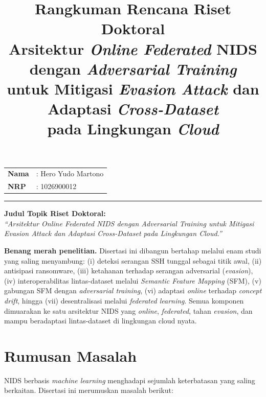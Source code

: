 \documentclass[11pt,a4paper]{article}
\title{\textbf{Rangkuman Rencana Riset Doktoral}\\[4pt]
\large Arsitektur \emph{Online Federated} NIDS dengan \emph{Adversarial Training}\\
untuk Mitigasi \emph{Evasion Attack} dan Adaptasi \emph{Cross-Dataset}\\
pada Lingkungan \emph{Cloud}}
\author{}
\date{}
\begin{document}
\maketitle

\begin{center}
\begin{tabular}{@{}ll@{}}
\textbf{Nama} & : Hero Yudo Martono \\
\textbf{NRP}  & : 1026900012 \\
\end{tabular}
\end{center}
\vspace{0.4em}
\hrule
\vspace{0.8em}

\noindent\textbf{Judul Topik Riset Doktoral:}\\[2pt]
\emph{``Arsitektur Online Federated NIDS dengan Adversarial Training untuk
Mitigasi Evasion Attack dan Adaptasi Cross-Dataset pada Lingkungan Cloud.''}

\vspace{0.6em}
\noindent\textbf{Benang merah penelitian.} Disertasi ini dibangun bertahap
melalui enam studi yang saling menyambung: (i) deteksi serangan SSH tunggal
sebagai titik awal, (ii) antisipasi ransomware, (iii) ketahanan terhadap
serangan adversarial (\emph{evasion}), (iv) interoperabilitas lintas-dataset
melalui \emph{Semantic Feature Mapping} (SFM), (v) gabungan SFM dengan
\emph{adversarial training}, (vi) adaptasi \emph{online} terhadap
\emph{concept drift}, hingga (vii) desentralisasi melalui \emph{federated
learning}. Semua komponen dimuarakan ke satu arsitektur NIDS yang
\emph{online}, \emph{federated}, tahan \emph{evasion}, dan mampu beradaptasi
lintas-dataset di lingkungan cloud nyata.

\section{Rumusan Masalah}

NIDS berbasis \emph{machine learning} menghadapi sejumlah keterbatasan yang
saling berkaitan. Disertasi ini merumuskan masalah berikut:
\end{document}
